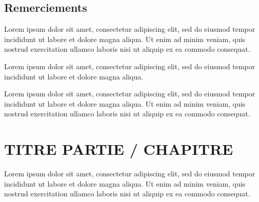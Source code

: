 \documentclass[a4paper]{book}
\begin{document}
\section*{Remerciements}

Lorem ipsum dolor sit amet, consectetur adipiscing elit, sed do eiusmod tempor
incididunt ut labore et dolore magna aliqua. Ut enim ad minim veniam, quis
nostrud exercitation ullamco laboris nisi ut aliquip ex ea commodo consequat.

Lorem ipsum dolor sit amet, consectetur adipiscing elit, sed do eiusmod tempor
incididunt ut labore et dolore magna aliqua.

Lorem ipsum dolor sit amet, consectetur adipiscing elit, sed do eiusmod tempor
incididunt ut labore et dolore magna aliqua. Ut enim ad minim veniam, quis
nostrud exercitation ullamco laboris nisi ut aliquip ex ea commodo consequat.


\renewcommand{\cftdot}{}
\newpage


\tableofcontents
\listoffigures       %
\listoftables        %

\makeatletter
\def\@makeschapterhead#1{%
  {\parindent \z@ \raggedright
    \interlinepenalty\@M
    \normalfont\sffamily\Huge \MakeUppercase{#1}\par\vskip-14pt\nobreak
    \color{ensigray}\vspace{-0.75em}\rule{\textwidth}{2.25pt}
    \vskip 16\p@
  }}
\makeatother

\chapter*{TITRE PARTIE / CHAPITRE}

\begin{center}
  \begin{minipage}{0.7\linewidth}
    \color{ensigray}\center
    Lorem ipsum dolor sit amet, consectetur adipiscing elit, sed do eiusmod tempor
    incididunt ut labore et dolore magna aliqua. Ut enim ad minim veniam, quis
    nostrud exercitation ullamco laboris nisi ut aliquip ex ea commodo consequat.
  \end{minipage}
\end{center}
\end{document}
